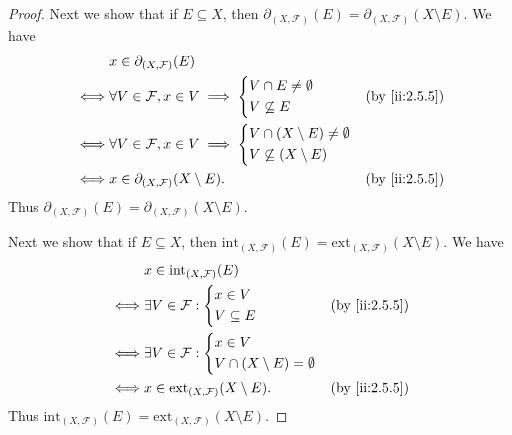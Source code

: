 \begin{proof}
  Next we show that if \(E \subseteq X\), then \(\partial_{(X, \mathcal{F})}(E) = \partial_{(X, \mathcal{F})}(X \setminus E)\).
  We have
  \begin{align*}
         & x \in \partial_{(X, \mathcal{F})}(E)                                              \\
    \iff & \forall V \in \mathcal{F}, x \in V \implies \begin{dcases}
                                                         V \cap E \neq \emptyset \\
                                                         V \not\subseteq E
                                                       \end{dcases} &  & \by{ii:2.5.5}          \\
    \iff & \forall V \in \mathcal{F}, x \in V \implies \begin{dcases}
                                                         V \cap (X \setminus E) \neq \emptyset \\
                                                         V \not\subseteq (X \setminus E)
                                                       \end{dcases} \\
    \iff & x \in \partial_{(X, \mathcal{F})}(X \setminus E).          &  & \by{ii:2.5.5}
  \end{align*}
  Thus \(\partial_{(X, \mathcal{F})}(E) = \partial_{(X, \mathcal{F})}(X \setminus E)\).

  Next we show that if \(E \subseteq X\), then \(\text{int}_{(X, \mathcal{F})}(E) = \text{ext}_{(X, \mathcal{F})}(X \setminus E)\).
  We have
  \begin{align*}
         & x \in \text{int}_{(X, \mathcal{F})}(E)                              \\
    \iff & \exists V \in \mathcal{F} : \begin{dcases}
                                         x \in V \\
                                         V \subseteq E
                                       \end{dcases}          &  & \by{ii:2.5.5}   \\
    \iff & \exists V \in \mathcal{F} : \begin{dcases}
                                         x \in V \\
                                         V \cap (X \setminus E) = \emptyset
                                       \end{dcases}       \\
    \iff & x \in \text{ext}_{(X, \mathcal{F})}(X \setminus E). &  & \by{ii:2.5.5}
  \end{align*}
  Thus \(\text{int}_{(X, \mathcal{F})}(E) = \text{ext}_{(X, \mathcal{F})}(X \setminus E)\).


\end{proof}
